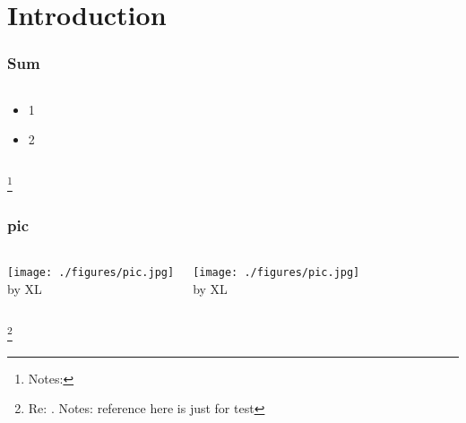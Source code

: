 \documentclass[hyperref={bookmarks=false},aspectratio=169]{beamer}
\newcommand\blfootnote[1]{%
  \begingroup
  \renewcommand\thefootnote{}%
  \footnote{#1}%
  \endgroup
}
\begin{document}
\section{Introduction}
\begin{frame}
  \frametitle{Sum}
  \begin{columns}[t]       %
        \begin{center}
          \begin{minipage}{1\textwidth} %
            \begin{itemize}
              \item 1
              \item 2
            \end{itemize}
            \end{minipage}
        \end{center}
  \end{columns} 
  \blfootnote{\tiny Notes:}  
\end{frame}
\begin{frame}
  \frametitle{pic}
  \begin{columns}[c]  %
    \centering
    \texttt{[image: ./figures/pic.jpg]}
    \vspace{0.2cm}  %
    \\
    \small by XL

    \centering
    \texttt{[image: ./figures/pic.jpg]}
    \vspace{0.2cm}  %
    \\
    \small by XL
  \end{columns}
  \blfootnote{\tiny Re: \cite{vaalmacost2018}. Notes: reference here is just for test}  
\end{frame}
\end{document}
